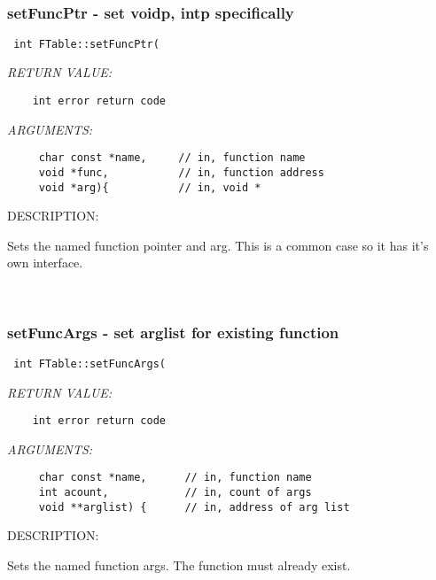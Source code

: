  
\mbox{}\hrulefill\
 
\subsubsection [setFuncPtr] {setFuncPtr - set voidp, intp specifically}


  
\begin{verbatim} int FTable::setFuncPtr(\end{verbatim}{\em RETURN VALUE:}
\begin{verbatim}    int error return code\end{verbatim}{\em ARGUMENTS:}
\begin{verbatim}     char const *name,     // in, function name
     void *func,           // in, function address
     void *arg){           // in, void *\end{verbatim}
{\sf DESCRIPTION:\\ }


      Sets the named function pointer and arg.  This is a common case
      so it has it's own interface.
   
 
\mbox{}\hrulefill\
 
\subsubsection [setFuncArgs] {setFuncArgs - set arglist for existing function}


  
\begin{verbatim} int FTable::setFuncArgs(\end{verbatim}{\em RETURN VALUE:}
\begin{verbatim}    int error return code\end{verbatim}{\em ARGUMENTS:}
\begin{verbatim}     char const *name,      // in, function name
     int acount,            // in, count of args
     void **arglist) {      // in, address of arg list\end{verbatim}
{\sf DESCRIPTION:\\ }


      Sets the named function args.  The function must already exist.
   
